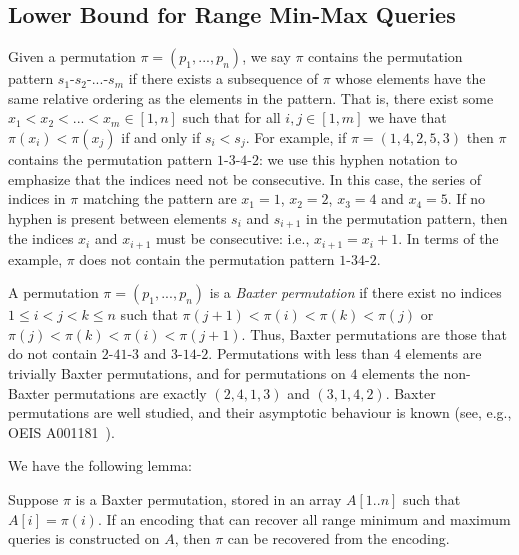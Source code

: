 \documentclass[runningheads]{llncs}
\newcommand{\forbMMOne}{3\text{-}14\text{-}2}
\newcommand{\forbMMTwo}{2\text{-}41\text{-}3}
\begin{document}
\subsection{Lower Bound for Range Min-Max Queries}

Given a permutation $\pi = (p_1, ..., p_n)$, we say $\pi$ contains the
permutation pattern $s_1\text{-}s_2\text{-}...\text{-}s_m$ if there
exists a subsequence of $\pi$ whose elements have the same relative
ordering as the elements in the pattern.  That is, there exist some
$x_1< x_2 <...< x_m \in [1,n]$ such that for all $i,j \in [1,m]$ we
have that $\pi(x_i) < \pi(x_j)$ if and only if $s_i < s_j$.  For
example, if $\pi = (1,4,2,5,3)$ then $\pi$ contains the permutation
pattern $1\text{-}3\text{-}4\text{-}2$: we use this hyphen notation to
emphasize that the indices need not be consecutive. In this case, the
series of indices in $\pi$ matching the pattern are $x_1 = 1$, $x_2 =
2$, $x_3 = 4$ and $x_4 = 5$.  If no hyphen is present between elements
$s_i$ and $s_{i+1}$ in the permutation pattern, then the indices $x_i$
and $x_{i+1}$ must be consecutive: i.e., $x_{i+1} = x_i +1$.  In terms
of the example, $\pi$ does not contain the permutation pattern
$1\text{-}34\text{-}2$.

A permutation $\pi = (p_1, ... , p_n)$ is a \emph{Baxter permutation}
if there exist no indices $1 \le i < j < k \le n$ such that $\pi(j+1)
< \pi(i) < \pi(k) < \pi(j)$ or $\pi(j) < \pi(k) < \pi(i) < \pi(j+1)$.
Thus, Baxter permutations are those that do not contain $\forbMMTwo$
and $\forbMMOne$.  Permutations with less than $4$ elements are
trivially Baxter permutations, and for permutations on $4$ elements
the non-Baxter permutations are exactly $(2,4,1,3)$ and $(3,1,4,2)$.
Baxter permutations are well studied, and their asymptotic behaviour
is known (see, e.g., OEIS A001181~\cite{OEIS}).

We have the following lemma:

\begin{lemma}\label{lem:baxter}
Suppose $\pi$ is a Baxter permutation, stored in an array $A[1..n]$
such that $A[i] = \pi(i)$.  If an encoding that can recover all range
minimum and maximum queries is constructed on $A$, then $\pi$ can be
recovered from the encoding.
\end{lemma}
\end{document}
